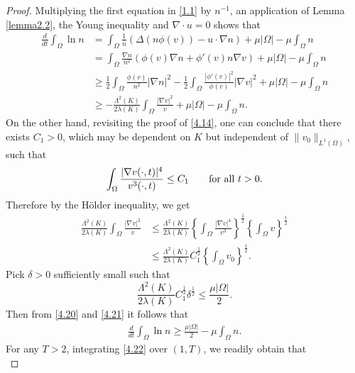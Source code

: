 \documentclass[12pt]{article}
\theoremstyle{plain}
\theoremstyle{definition}
\numberwithin{equation}{section}
\begin{document}
\begin{proof}[Proof] Multiplying the first equation in \eqref{1.1} by $n^{-1}$, an application of Lemma \ref{lemma2.2}, the Young inequality and $\nabla\cdot u=0$ shows that
\begin{equation}\label{4.20}
\begin{split}
\frac d{dt}\int_\Omega \ln n
&=\int_\Omega \frac 1 n
(\Delta (n\phi(v))-u\cdot\nabla n)+ \mu|\Omega|- \mu\int_\Omega  n\\
&=\int_\Omega\frac{\nabla n}{n^2}
(\phi(v) \nabla n+\phi'(v)n \nabla v )+ \mu|\Omega|- \mu\int_\Omega  n\\
&\geq \frac12\int_\Omega \frac{\phi(v)} {n^2}|\nabla n|^2-\frac12
\int_\Omega \frac{|\phi'(v)|^2} {\phi(v)} |\nabla v|^2+ \mu|\Omega|- \mu\int_\Omega  n\\
&\geq-
\frac{\Lambda^2(K)}{2\lambda(K)}\int_\Omega \frac {|\nabla v|^2}v + \mu|\Omega|- \mu\int_\Omega  n.
\end{split}
\end{equation}
On the other hand, revisiting the proof of  \eqref{4.14}, one can conclude that there exists $C_1>0$,  which may be dependent on  $K$ but independent of $\|v_0\|_{L^1(\Omega)}$,  such that
$$\int_\Omega \frac{|\nabla v(\cdot,t)|^4}{v^3(\cdot,t)}\le C_1  \quad\quad \hbox{for all}\,\, t>0.
$$
Therefore by the H\"{o}lder inequality,  we get
\begin{equation}\label{4.21}
\begin{split}
\frac{\Lambda^2(K)}{2\lambda(K)}\int_\Omega \frac {|\nabla v|^2}v
&\leq
  \frac{\Lambda^2(K)}{2\lambda(K)}\left\{ \int_\Omega\frac {|\nabla v|^4}{v^3}\right\}^{\frac 12}
\left\{\int_\Omega  v \right\} ^{\frac 12}\\
&\leq  \frac{\Lambda^2(K)}{2\lambda(K)}C_1^{\frac 12} \left\{\int_\Omega  v_0 \right\} ^{\frac 12}.
\end{split}
\end{equation}
Pick $\delta>0$ sufficiently small such that
$$ \frac{\Lambda^2(K)}{2\lambda(K)}C_1^{\frac 12} \delta ^{\frac 12}\leq \frac{ \mu|\Omega|}2.
$$
 Then from \eqref{4.20} and \eqref{4.21} it follows that
\begin{equation}\label{4.22}
\begin{split}
\frac d{dt}\int_\Omega \ln n
\geq
\frac{ \mu|\Omega|}2- \mu\int_\Omega  n.
\end{split}
\end{equation}
For any $T>2$, integrating \eqref{4.22} over $(1,T)$, we readily obtain that
\begin{equation}\label{4.23}

\end{equation}
\end{proof}
\end{document}
